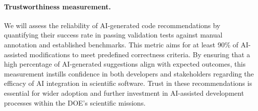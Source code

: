 %





\paragraph{Trustworthiness measurement.} We will assess the reliability of AI-generated code recommendations by quantifying their success rate in passing validation tests against manual annotation and established benchmarks. This metric aims for at least 90\% of AI-assisted modifications to meet predefined correctness criteria. By ensuring that a high percentage of AI-generated suggestions align with expected outcomes, this measurement instills confidence in both developers and stakeholders regarding the efficacy of AI integration in scientific software. Trust in these recommendations is essential for wider adoption and further investment in AI-assisted development processes within the DOE's scientific missions.

